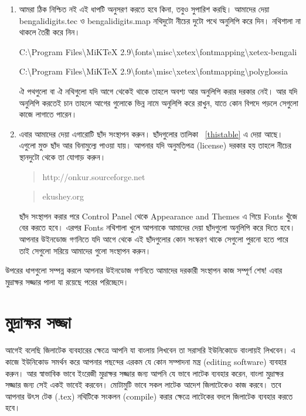 \documentclass[a4paper,10pt,xetex]{article}
\begin{document}
\begin{enumerate}
\item আমরা ঠিক নিশ্চিত নই এই ধাপটি অনুসরণ করতে হবে কিনা, তবুও সুপারিশ করছি। আমাদের দেয়া bengalidigits.tec ও bengalidigits.map নথিদুটো নীচের দুটো পথে অনুলিপি করে দিন।  নথিশালা না থাকলে তৈরী করে নিন।
\begin{scriptsize}\begin{center}‌C:\textbackslash{}Program Files\textbackslash{}MiKTeX 2.9\textbackslash{}fonts\textbackslash{}misc\textbackslash{}xetex\textbackslash{}fontmapping\textbackslash{}xetex-bengali\end{center}\end{scriptsize}\begin{scriptsize}\begin{center}C:\textbackslash{}Program Files\textbackslash{}MiKTeX 2.9\textbackslash{}fonts\textbackslash{}misc\textbackslash{}xetex\textbackslash{}fontmapping\textbackslash{}polyglossia\end{center}\end{scriptsize}
ঐ পথগুলো বা ঐ নথিগুলো যদি আগে থেকেই থাকে তাহলে অবশ্য আর অনুলিপি করার দরকার নেই। আর যদি অনুলিপি করতেই চান তাহলে আগের গুলোকে ভিন্ন নামে অনুলিপি করে রাখুন, যাতে কোন বিপদে পড়লে সেগুলো কাজে লাগাতে পারেন।

\item এবার আমাদের দেয়া এগারোটি ছাঁদ সংস্থাপন করুন। ছাঁদগুলোর তালিকা \tablename~\ref{thistable} এ দেয়া আছে।  এগুলো মুক্ত ছাঁদ আর বিনামুল্যে পাওয়া যায়। আপনার যদি অনুমতিপত্র (license) দরকার হয় তাহলে নীচের স্থানদুটো থেকে তা যোগাড় করুন। ‌\begin{quote}http://onkur.sourceforge.net\end{quote}\begin{quote}ekushey.org\end{quote} ছাঁদ সংস্থাপন করার পরে Control Panel থেকে Appearance and Themes এ গিয়ে Fonts খুঁজে বের করতে হবে। এরপর Fonts নথিশালা খুলে আপনাকে আমাদের দেয়া ছাঁদগুলো অনুলিপি করে দিতে হবে। আপনার উইনডোজ গণনিতে যদি আগে থেকে এই ছাঁদগুলোর কোন সংস্করণ থাকে সেগুলো পুরনো হতে পারে তাই সেগুলো সরিয়ে আমাদের গুলো সংস্থাপন করুন। 
\end{enumerate}

উপরের ধাপগুলো সম্পন্ন করলে আপনার উইনডোজ গণনিতে আমাদের দরকারী সংস্থাপন কাজ সম্পূর্ণ শেষ! এবার মুদ্রাক্ষর সজ্জার পালা যা রয়েছে পরের পরিচ্ছেদে।

\section{মুদ্রাক্ষর সজ্জা}

আগেই বলেছি জিলাটেক ব্যবহারের ক্ষেত্রে আপনি যা বাংলায় লিখবেন তা সরাসরি ইউনিকোডে বাংলায়ই লিখবেন। এ কাজে ইউনিকোড সমর্থন করে আপনার পছন্দের এরকম যে কোন সম্পাদনা মন্ত্র (editing software) ব্যবহার করুন। আর স্বাভাবিক ভাবে ইংরেজী মুদ্রাক্ষর সজ্জার জন্য আপনি যে ভাবে লাটেক ব্যবহার করেন, বাংলা মুদ্রাক্ষর সজ্জার জন্য সেই একই ভাবেই করবেন। মোটামুটি ভাবে সকল লাটেক আদেশ জিলাটেকেও কাজ করবে। তবে আপনার উৎস টেক (.tex) নথিটিকে সংকলন (compile) করার ক্ষেত্রে লাটেকের বদলে জিলাটেক ব্যবহার করতে হবে।  
\end{document}
